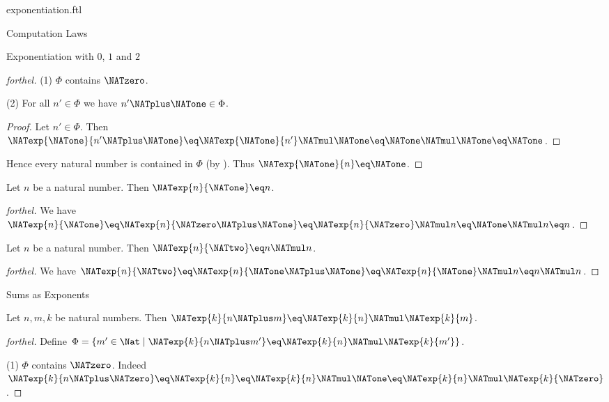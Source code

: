 \documentclass{naproche-library}
\begin{document}
\begin{smodule}[title=Exponentiation]{exponentiation.ftl}
\begin{sfragment}{Computation Laws}
\begin{sfragment}{Exponentiation with $0$, $1$ and $2$}
\begin{proof}[forthel]
      (1) $\Phi$ contains $\NATzero$.

      (2) For all $n' \in \Phi$ we have $n' \NATplus \NATone \in \Phi$.
      \begin{proof}
        Let $n' \in \Phi$.
        Then $\NATexp{\NATone}{n' \NATplus \NATone}
          \eq \NATexp{\NATone}{n'} \NATmul \NATone
          \eq \NATone \NATmul \NATone
          \eq \NATone$.
      \end{proof}

      Hence every natural number is contained in $\Phi$ (by ).
      Thus $\NATexp{\NATone}{n} \eq \NATone$.
    \end{proof}

    \begin{proposition}[forthel,id=ARITHMETIC_09_4975279749464064]
      Let $n$ be a natural number.
      Then $\NATexp{n}{\NATone} \eq n$.
    \end{proposition}
    \begin{proof}[forthel]
      We have $\NATexp{n}{\NATone}
        \eq \NATexp{n}{\NATzero \NATplus \NATone}
        \eq \NATexp{n}{\NATzero} \NATmul n
        \eq \NATone \NATmul n
        \eq n$.
    \end{proof}

    \begin{proposition}[forthel,id=ARITHMETIC_09_8513812055457792]
      Let $n$ be a natural number.
      Then $\NATexp{n}{\NATtwo} \eq n \NATmul n$.
    \end{proposition}
    \begin{proof}[forthel]
      We have $\NATexp{n}{\NATtwo}
        \eq \NATexp{n}{\NATone \NATplus \NATone}
        \eq \NATexp{n}{\NATone} \NATmul n
        \eq n \NATmul n$.
    \end{proof}
  \end{sfragment}

  \begin{sfragment}{Sums as Exponents}
    \begin{proposition}[forthel,id=ARITHMETIC_09_8152207530655744]
      Let $n, m, k$ be natural numbers.
      Then $\NATexp{k}{n \NATplus m} \eq \NATexp{k}{n} \NATmul \NATexp{k}{m}$.
    \end{proposition}
    \begin{proof}[forthel]
      Define $\Phi = \{ m' \in \Nat \mid \NATexp{k}{n \NATplus m'} \eq \NATexp{k}{n} \NATmul \NATexp{k}{m'} \}$.

      (1) $\Phi$ contains $\NATzero$.
      Indeed $\NATexp{k}{n \NATplus \NATzero}
        \eq \NATexp{k}{n}
        \eq \NATexp{k}{n} \NATmul \NATone
        \eq \NATexp{k}{n} \NATmul \NATexp{k}{\NATzero}$.


\end{proof}
\end{sfragment}
\end{sfragment}
\end{smodule}
\end{document}
